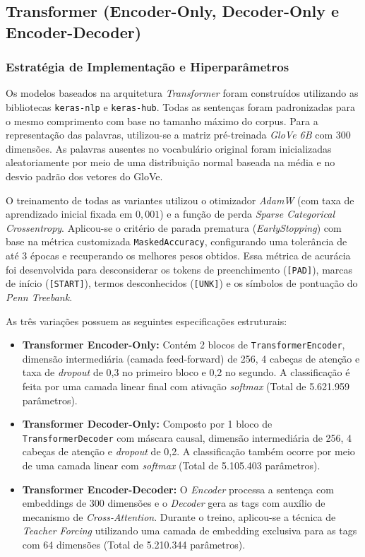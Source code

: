 \documentclass[a4paper,12pt]{article}
\begin{document}
\subsection{Transformer (Encoder-Only, Decoder-Only e Encoder-Decoder)}

\subsubsection{Estratégia de Implementação e Hiperparâmetros}
Os modelos baseados na arquitetura \textit{Transformer} foram construídos utilizando as bibliotecas \texttt{keras-nlp} e \texttt{keras-hub}. Todas as sentenças foram padronizadas para o mesmo comprimento com base no tamanho máximo do corpus. Para a representação das palavras, utilizou-se a matriz pré-treinada \textit{GloVe 6B} com 300 dimensões. As palavras ausentes no vocabulário original foram inicializadas aleatoriamente por meio de uma distribuição normal baseada na média e no desvio padrão dos vetores do GloVe.

O treinamento de todas as variantes utilizou o otimizador \textit{AdamW} (com taxa de aprendizado inicial fixada em $0,001$) e a função de perda \textit{Sparse Categorical Crossentropy}. Aplicou-se o critério de parada prematura (\textit{EarlyStopping}) com base na métrica customizada \texttt{MaskedAccuracy}, configurando uma tolerância de até 3 épocas e recuperando os melhores pesos obtidos. Essa métrica de acurácia foi desenvolvida para desconsiderar os tokens de preenchimento (\texttt{[PAD]}), marcas de início (\texttt{[START]}), termos desconhecidos (\texttt{[UNK]}) e os símbolos de pontuação do \textit{Penn Treebank}.

As três variações possuem as seguintes especificações estruturais:
\begin{itemize}
    \item \textbf{Transformer Encoder-Only:} Contém 2 blocos de \texttt{TransformerEncoder}, dimensão intermediária (camada feed-forward) de 256, 4 cabeças de atenção e taxa de \textit{dropout} de 0,3 no primeiro bloco e 0,2 no segundo. A classificação é feita por uma camada linear final com ativação \textit{softmax} (Total de 5.621.959 parâmetros).
    \item \textbf{Transformer Decoder-Only:} Composto por 1 bloco de \texttt{TransformerDecoder} com máscara causal, dimensão intermediária de 256, 4 cabeças de atenção e \textit{dropout} de 0,2. A classificação também ocorre por meio de uma camada linear com \textit{softmax} (Total de 5.105.403 parâmetros).
    \item \textbf{Transformer Encoder-Decoder:} O \textit{Encoder} processa a sentença com embeddings de 300 dimensões e o \textit{Decoder} gera as tags com auxílio de mecanismo de \textit{Cross-Attention}. Durante o treino, aplicou-se a técnica de \textit{Teacher Forcing} utilizando uma camada de embedding exclusiva para as tags com 64 dimensões (Total de 5.210.344 parâmetros).
\end{itemize}
\end{document}
